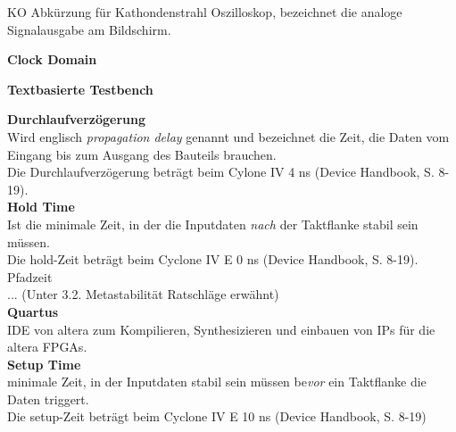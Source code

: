 KO
Abkürzung für Kathondenstrahl Oszilloskop, bezeichnet die analoge Signalausgabe am Bildschirm.

\textbf{Clock Domain}


\textbf{Textbasierte Testbench}


\textbf{Durchlaufverzögerung}\\

Wird englisch \textit{propagation delay} genannt und bezeichnet die Zeit, die Daten vom Eingang bis zum Ausgang des Bauteils brauchen.\\
Die Durchlaufverzögerung beträgt beim Cylone IV 4 ns (Device Handbook, S. 8-19).\\


\textbf{Hold Time}\\
Ist die minimale Zeit, in der die Inputdaten \textit{nach} der Taktflanke stabil sein müssen.\\
Die hold-Zeit beträgt beim  Cyclone IV E 0 ns (Device Handbook, S. 8-19).\\


Pfadzeit\\
... (Unter 3.2. Metastabilität Ratschläge erwähnt)\\



\textbf{Quartus}\\
IDE von altera zum Kompilieren, Synthesizieren und einbauen von IPs für die altera FPGAs.\\


\textbf{Setup Time} \\
minimale Zeit, in der Inputdaten stabil sein müssen be\textit{vor} ein Taktflanke die Daten triggert.\\
Die setup-Zeit beträgt beim Cyclone IV E 10 ns (Device Handbook, S. 8-19)\\




